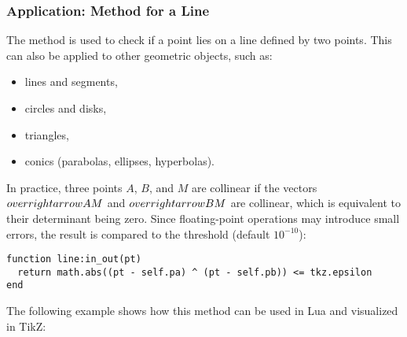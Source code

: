 
\subsubsection{Application:  Method for a Line} %
\label{ssub:in_out_for_a_line}

The method  is used to check if a point lies on a line defined by two points. This can also be applied to other geometric objects, such as:

\begin{itemize}
  \item lines and segments,
  \item circles and disks,
  \item triangles,
  \item conics (parabolas, ellipses, hyperbolas).
\end{itemize}

In practice, three points \( A \), \( B \), and \( M \) are collinear if the vectors \( \\overrightarrow{AM} \) and \( \\overrightarrow{BM} \) are collinear, which is equivalent to their determinant being zero. Since floating-point operations may introduce small errors, the result is compared to the threshold  (default \( 10^{-10} \)):

\begin{mybox}
\begin{verbatim}
function line:in_out(pt)
  return math.abs((pt - self.pa) ^ (pt - self.pb)) <= tkz.epsilon
end
\end{verbatim}
\end{mybox}

The following example shows how this method can be used in Lua and visualized in TikZ:

\vspace{1em}

